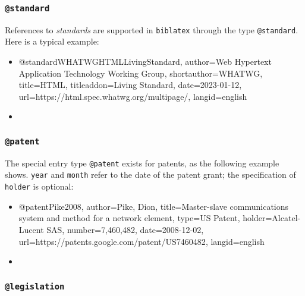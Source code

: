
\subsubsection{\texttt{\bfseries @standard}}
\label{sec:@standard}

References to \emph{standards} are supported in \texttt{biblatex} through the
type \texttt{@standard}. Here is a typical example:
%
\begin{itemize}
\item[]
\begin{GenericCode}[numbers=none]
@standard{WHATWGHTMLLivingStandard,
  author={{Web Hypertext Application Technology Working Group}},
  shortauthor={WHATWG},
  title={HTML},
  titleaddon={Living Standard},
  date={2023-01-12},
  url={https://html.spec.whatwg.org/multipage/},
  langid={english}
}
\end{GenericCode}
\item[\cite{WHATWGHTMLLivingStandard}] 
\end{itemize}
%


\subsubsection{\texttt{\bfseries @patent}}
\label{sec:@patent}

The special entry type \texttt{@patent} exists for patents, as the following
example shows. \texttt{year} and \texttt{month} refer to the date of the patent
grant; the specification of \texttt{holder} is optional:
%
\begin{itemize}
\item[]
\begin{GenericCode}[numbers=none]
@patent{Pike2008,
  author={Pike, Dion},
  title={Master-slave communications system and method for a network element},
  type={US Patent},
  holder={Alcatel-Lucent SAS},
  number={7,460,482},
  date={2008-12-02},
  url={https://patents.google.com/patent/US7460482},
  langid={english}
}
\end{GenericCode}
\item[\cite{Pike2008}] 
\end{itemize}
%


\subsubsection{\texttt{\bfseries @legislation}}
\label{sec:@legislation}

